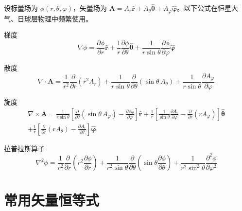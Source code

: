 \documentclass[12pt,a4paper,openany,oneside]{book}
\newcommand{\vect}[1]{\bm{#1}}
\newcommand{\unitvec}[1]{\hat{\vect{#1}}}
\newcommand{\grad}{\nabla}
\newcommand{\curl}{\nabla\times}
\newcommand{\divg}{\nabla\cdot}
\newcommand{\lap}{\nabla^2}
\begin{document}
设标量场为 $\phi(r,\theta,\varphi)$，矢量场为 $\vect{A}=A_r\unitvec{r}+A_\theta\unitvec{\theta}+A_\varphi\unitvec{\varphi}$。以下公式在恒星大气、日球层物理中频繁使用。

\begin{definition}{梯度}{}{}
\begin{equation}
\grad\phi = \frac{\partial \phi}{\partial r}\unitvec{r}
+ \frac{1}{r}\frac{\partial \phi}{\partial \theta}\unitvec{\theta}
+ \frac{1}{r\sin\theta}\frac{\partial \phi}{\partial \varphi}\unitvec{\varphi}
\end{equation}
\end{definition}

\begin{definition}{散度}{}{}
\begin{equation}
\divg\vect{A} = \frac{1}{r^2}\frac{\partial }{\partial r}(r^2A_r)
+ \frac{1}{r\sin\theta}\frac{\partial }{\partial \theta}(\sin\theta\,A_\theta)
+ \frac{1}{r\sin\theta}\frac{\partial A_\varphi}{\partial \varphi}
\end{equation}
\end{definition}

\begin{definition}{旋度}{}{}
\begin{multline}
\curl\vect{A} =
\frac{1}{r\sin\theta}\left[\frac{\partial }{\partial \theta}(\sin\theta\,A_\varphi)-\frac{\partial A_\theta}{\partial \varphi}\right]\unitvec{r}
+ \frac{1}{r}\left[\frac{1}{\sin\theta}\frac{\partial A_r}{\partial \varphi}-\frac{\partial }{\partial r}(rA_\varphi)\right]\unitvec{\theta} \\[6pt]
+ \frac{1}{r}\left[\frac{\partial }{\partial r}(rA_\theta)-\frac{\partial A_r}{\partial \theta}\right]\unitvec{\varphi}
\end{multline}
\end{definition}

\begin{definition}{拉普拉斯算子}{}{}
\begin{equation}
\lap\phi = \frac{1}{r^2}\frac{\partial }{\partial r}\!\left(r^2\frac{\partial \phi}{\partial r}\right)
+ \frac{1}{r^2\sin\theta}\frac{\partial }{\partial \theta}\!\left(\sin\theta\frac{\partial \phi}{\partial \theta}\right)
+ \frac{1}{r^2\sin^2\theta}\frac{\partial^2 \phi}{\partial \varphi^2}
\end{equation}
\end{definition}


\section{常用矢量恒等式}
\end{document}
